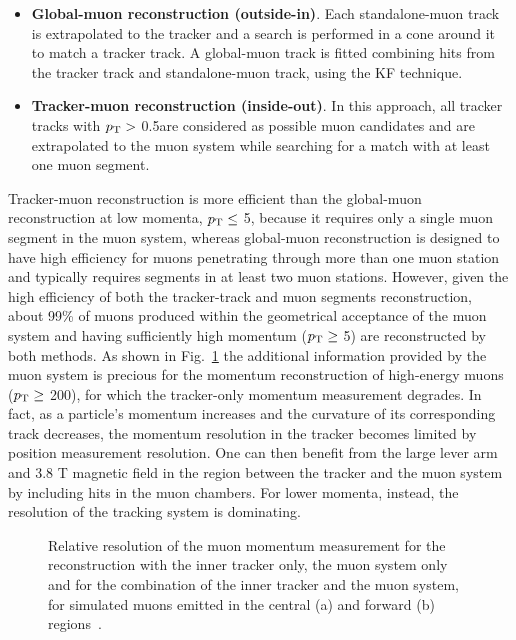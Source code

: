 \begin{itemize}
\item {\bf Global-muon reconstruction (outside-in)}. Each standalone-muon track is extrapolated to the tracker and a search is performed in a cone around it to match a tracker track. A global-muon track is fitted combining hits from the tracker track and standalone-muon track, using the KF technique.
\item {\bf Tracker-muon reconstruction (inside-out)}. In this approach, all tracker tracks with $p_{\mathrm{T}} >$ 0.5\GeV are considered as possible muon candidates and are extrapolated to the muon system while searching for a match with at least one muon segment.
\end{itemize}

Tracker-muon reconstruction is more efficient than the global-muon reconstruction at low momenta, $p_{\mathrm{T}} \leq$ 5\GeV, because it requires only a single muon segment in the muon system, whereas global-muon reconstruction is designed to have high efficiency for muons penetrating through more than one muon station and typically requires segments in at least two muon stations. However, given the high efficiency of both the tracker-track and muon segments reconstruction, about 99\% of muons produced within the geometrical acceptance of the muon system and having sufficiently high momentum ($p_{\mathrm{T}} \geq$ 5\GeV) are reconstructed by both methods. As shown in Fig.~\ref{fig:mu_ptrel} the additional information provided by the muon system is precious for the momentum reconstruction of high-energy muons ($p_{\mathrm{T}} \geq$ 200\GeV), for which the tracker-only momentum measurement degrades. 
In fact, as a particle's momentum increases and the curvature of its corresponding track decreases, the momentum resolution in the tracker becomes limited by position measurement resolution. One can then benefit from the large lever arm and 3.8 T magnetic field in the region between the tracker and the muon system by including hits in the muon chambers. For lower momenta, instead, the resolution of the tracking system is dominating.

\begin{figure}[!htb]
\centering
{}\quad\quad\quad
{}
\caption{Relative resolution of the muon momentum measurement for the reconstruction with the inner tracker only, the muon system only and for the combination of the inner tracker and the muon system, for simulated muons emitted in the central (a) and forward (b) regions~\cite{Bayatian:922757}.}
\label{fig:mu_ptrel}
\end{figure}

